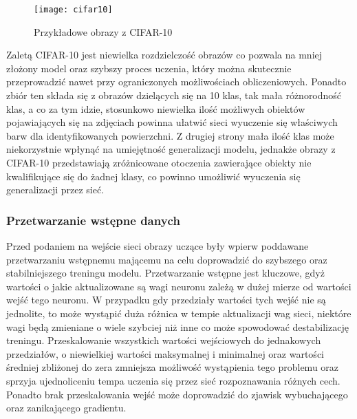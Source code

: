   \begin{figure}[h]
   \centering
   \texttt{[image: cifar10]}
   \caption[Przykładowe obrazy z CIFAR-10 - źródło: Rysunek własny]
   {Przykładowe obrazy z CIFAR-10}
   \label{fig:cifar10}
  \end{figure}

  Zaletą CIFAR-10 jest niewielka rozdzielczość obrazów co pozwala na mniej
  złożony model oraz szybszy proces uczenia, który można skutecznie przeprowadzić
  nawet przy ograniczonych możliwościach obliczeniowych. Ponadto zbiór ten składa
  się z obrazów dzielących się na 10 klas, tak mała różnorodność klas, a co za
  tym idzie, stosunkowo niewielka ilość możliwych obiektów pojawiających się
  na zdjęciach powinna ułatwić sieci wyuczenie się właściwych barw dla
  identyfikowanych powierzchni. Z drugiej strony mała ilość klas może niekorzystnie
  wpłynąć na umiejętność generalizacji modelu, jednakże obrazy z CIFAR-10
  przedstawiają zróżnicowane otoczenia zawierające obiekty nie kwalifikujące
  się do żadnej klasy, co powinno umożliwić wyuczenia się generalizacji przez
  sieć.

  \subsubsection{Przetwarzanie wstępne danych}

  Przed podaniem na wejście sieci obrazy uczące były wpierw poddawane
  przetwarzaniu wstępnemu mającemu na celu doprowadzić do szybszego oraz
  stabilniejszego treningu modelu. Przetwarzanie wstępne jest kluczowe, gdyż
  wartości o jakie aktualizowane są wagi neuronu zależą w dużej mierze od
  wartości wejść tego neuronu. W przypadku gdy przedziały wartości tych wejść
  nie są jednolite, to może wystąpić duża różnica w tempie aktualizacji wag
  sieci, niektóre wagi będą zmieniane o wiele szybciej niż inne co może spowodować
  destabilizację treningu. Przeskalowanie wszystkich wartości wejściowych do jednakowych
  przedziałów, o niewielkiej wartości maksymalnej i minimalnej oraz wartości
  średniej zbliżonej do zera zmniejsza możliwość wystąpienia tego problemu
  oraz sprzyja ujednoliceniu tempa uczenia się przez sieć rozpoznawania różnych cech.
  Ponadto brak przeskalowania wejść może doprowadzić do zjawisk wybuchającego
  oraz zanikającego gradientu.


